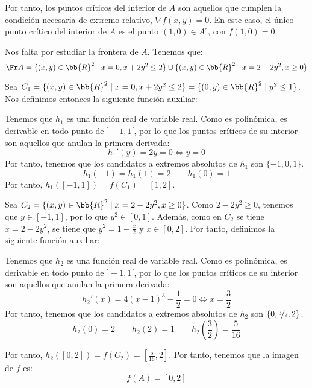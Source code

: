 \begin{ejercicio}
    Por tanto, los puntos críticos del interior de $A$ son aquellos que
    cumplen la condición necesaria de extremo relativo, $\nabla f(x,y)=0$. En este caso, el único punto crítico del interior de $A$ es el punto $(1,0)\in A^\circ$,
    con $f(1,0)=0$.

    Nos falta por estudiar la frontera de $A$. Tenemos que:
    \begin{equation*}
        \Fr A = \{(x,y)\in \bb{R}^2\mid x=0, x+2y^2\leq 2\} \cup \{(x,y)\in \bb{R}^2\mid x=2-2y^2, x\geq 0\}
    \end{equation*}

    Sea $C_1=\{(x,y)\in \bb{R}^2\mid x=0, x+2y^2\leq 2\}=\{(0,y)\in \bb{R}^2\mid y^2\leq 1\}$.
    Nos definimos entonces la siguiente función auxiliar:

    Tenemos que $h_1$ es una función real de variable real. Como es polinómica, es derivable en todo punto de $]-1,1[$, por lo que los puntos críticos de su interior son aquellos que anulan la primera derivada:
    \begin{equation*}
        h_1'(y) = 2y = 0 \Longleftrightarrow y=0
    \end{equation*}
    Por tanto, tenemos que los candidatos a extremos absolutos de $h_1$ son $\{-1,0,1\}$.
    \begin{equation*}
        h_1(-1)=h_1(1)=2 \qquad h_1(0)=1
    \end{equation*}
    Por tanto, $h_1\left(\left[-1,1\right]\right)=f(C_1) = [1,2]$.

    Sea $C_2=\{(x,y)\in \bb{R}^2\mid x=2-2y^2, x\geq 0\}$. Como $2-2y^2\geq 0$, tenemos que $y\in \left[-1,1\right]$, por lo que $y^2\in [0,1]$. Además, como en $C_2$ se tiene $x=2-2y^2$, se tiene que $y^2=1-\frac{x}{2}$ y $x\in [0,2]$. Por tanto, definimos la siguiente función auxiliar:

    Tenemos que $h_2$ es una función real de variable real. Como es polinómica, es derivable en todo punto de $]-1,1[$, por lo que los puntos críticos de su interior son aquellos que anulan la primera derivada:
    \begin{equation*}
        h_2'(x) = 4(x-1)^3 - \frac{1}{2} = 0 \Longleftrightarrow x=\frac{3}{2}
    \end{equation*}
    Por tanto, tenemos que los candidatos a extremos absolutos de $h_2$ son $\{0,\nicefrac{3}{2},2\}$.
    \begin{equation*}
        h_2(0)=2 \qquad h_2(2)=1 \qquad h_2\left(\frac{3}{2}\right) = \frac{5}{16}
    \end{equation*}

    Por tanto, $h_2\left(\left[0,2\right]\right)=f(C_2) = \left[\frac{5}{16}, 2\right]$. Por tanto, tenemos que la imagen de $f$ es:
    \begin{equation*}
        f(A) = \left[0, 2\right]
    \end{equation*}
\end{ejercicio}



